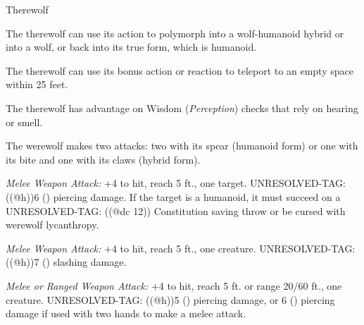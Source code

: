 \documentclass[10pt,twoside,twocolumn,openany,nodeprecatedcode]{dndbook}
\begin{document}
\begin{DndMonster}[width=\textwidth + 8pt]{Therewolf}
\begin{multicols}{2}
\DndMonsterBasics[armor-class = {11 in humanoid form, 12 ( natural armor) in wolf or hybrid form}, hit-points  = {\DndDice{6d8 + 12}}, speed = {walk 30 ft. (40 ft. in wolf form)}]
\DndMonsterAbilityScores[str = 15,dex = 13,con = 14,int = 10,wis = 11,cha = 10]
\DndMonsterDetails[skills = {\textit{Perception} +4}, languages = {Common (can't speak in wolf form)}, challenge = {3}]
The therewolf can use its action to polymorph into a wolf-humanoid hybrid or into a wolf, or back into its true form, which is humanoid.

The therewolf can use its bonus action or reaction to teleport to an empty space within 25 feet.

The therewolf has advantage on Wisdom (\textit{Perception}) checks that rely on hearing or smell.

The werewolf makes two attacks: two with its spear (humanoid form) or one with its bite and one with its claws (hybrid form).

\textsl{Melee Weapon Attack:} +4 to hit, reach 5 ft., one target. UNRESOLVED-TAG: ((@h))6 () piercing damage. If the target is a humanoid, it must succeed on a UNRESOLVED-TAG: ((@dc 12)) Constitution saving throw or be cursed with werewolf lycanthropy.

\textsl{Melee Weapon Attack:} +4 to hit, reach 5 ft., one creature. UNRESOLVED-TAG: ((@h))7 () slashing damage.

\textsl{Melee or Ranged Weapon Attack:} +4 to hit, reach 5 ft. or range 20/60 ft., one creature. UNRESOLVED-TAG: ((@h))5 () piercing damage, or 6 () piercing damage if used with two hands to make a melee attack.

\end{multicols}
\end{DndMonster}
\end{document}
